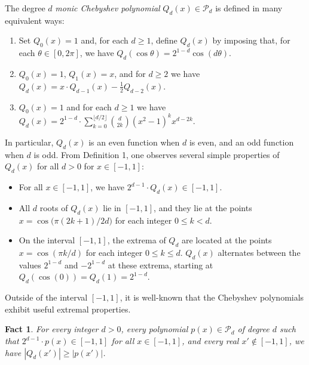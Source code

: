 \documentclass[10pt,a4paper]{article}
\theoremstyle{plain}\newtheorem{theorem}{Theorem}
\newtheorem{fact}[theorem]{Fact}
\theoremstyle{definition}
\begin{document}
The degree $d$ \emph{monic Chebyshev polynomial} $Q_d (x) \in \mathcal{P}_d$ is defined in many equivalent ways:
\begin{enumerate}[{Definition} 1]
    \item Set $Q_0 (x) = 1$ and, for each $d \ge 1$, define $Q_d (x)$ by imposing that, for each $\theta \in [0, 2 \pi]$, we have $Q_d (\cos \theta) = 2^{1 - d} \cos (d \theta)$. 
    \item $Q_0(x) = 1$, $Q_1(x) = x$, and for $d \geq 2$ we have $Q_d(x) = x \cdot Q_{d-1}(x) - \frac12 Q_{d-2}(x)$.
    \item $Q_0 (x) = 1$ and for each $d \ge 1$ we have $Q_d(x) = 2^{1-d} \cdot \sum_{k=0}^{\lfloor d/2 \rfloor} \binom{d}{2k} (x^2-1)^k x^{d-2k}$.
\end{enumerate}

In particular, $Q_d(x)$ is an even function when $d$ is even, and an odd function when $d$ is odd. From Definition 1, one observes several simple properties of $Q_d(x)$ for all $d>0$ for $x \in [-1,1]$:
\begin{itemize}
    \item For all $x \in [-1,1]$, we have $2^{d-1} \cdot Q_d(x) \in [-1,1]$.
    \item All $d$ roots of $Q_d(x)$ lie in $[-1,1]$, and they lie at the points $x = \cos \big( \pi (2k+1)/2d  \big)$ for each integer $0 \leq k < d$.
    \item On the interval $[-1,1]$, the extrema of $Q_d$ are located at the points $x = \cos\left( \pi k / d \right)$ for each integer $0 \leq k \leq d$. $Q_d(x)$ alternates between the values $2^{1-d}$ and $-2^{1-d}$ at these extrema, starting at $Q_d(\cos(0)) = Q_d(1) = 2^{1-d}$.
\end{itemize}  

Outside of the interval $[-1,1]$, it is well-known that the Chebyshev polynomials exhibit useful extremal properties.

\begin{fact} \label{extremalcheby}
For every integer $d>0$, every polynomial $p(x) \in \mathcal{P}_d$ of degree $d$ such that $2^{d-1} \cdot p(x) \in [-1,1]$ for all $x \in [-1,1]$, and every real $x' \notin [-1,1]$, we have $|Q_d(x')| \geq |p(x')|$.
\end{fact}
\end{document}
